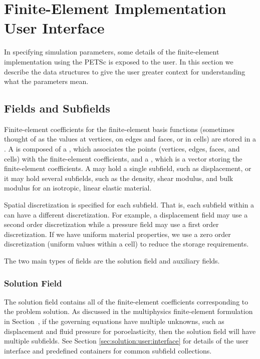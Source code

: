 \section{Finite-Element Implementation User Interface}

In specifying simulation parameters, some details of the
finite-element implementation using the PETSc  is
exposed to the user. In this section we describe the data structures
to give the user greater context for understanding what the parameters
mean.


\subsection{Fields and Subfields}

Finite-element coefficients for the finite-element basis functions
(sometimes thought of as the values at vertices, on edges and faces,
or in cells) are stored in a . A  is
composed of a , which associates the points (vertices,
edges, faces, and cells) with the finite-element coefficients, and a
, which is a vector storing the finite-element
coefficients. A  may hold a single subfield, such as
displacement, or it may hold several subfields, such as the density,
shear modulus, and bulk modulus for an isotropic, linear elastic
material.

Spatial discretization is specified for each subfield. That is, each subfield
within a  can have a different discretization. For
example, a displacement field may use a second order discretization
while a pressure field may use a first order discretization. If we
have uniform material properties, we use a zero order discretization
(uniform values within a cell) to reduce the storage requirements.

The two main types of fields are the solution field and auxiliary
fields.

\subsubsection{Solution Field}

The solution field contains all of the finite-element coefficients
corresponding to the problem solution. As discussed in the
multiphysics finite-element formulation in
Section~\label{sec:multiphysics:formulation}, if the governing
equations have multiple unknowns, such as displacement and fluid
pressure for poroelasticity, then the solution field will have
multiple subfields.  See Section \vref{sec:solution:user:interface} for
details of the user interface and predefined containers for common
subfield collections.

